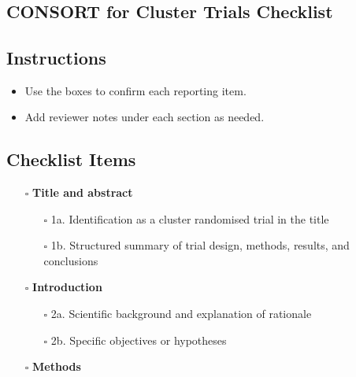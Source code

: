\documentclass[11pt]{article}
\def\tightlist{}
\begin{document}
\begin{center}
{\LARGE }\\[4pt]
\normalsize 
\end{center}
\vspace{1em}

\begin{Form}

\section{CONSORT for Cluster Trials
Checklist}\label{consort-for-cluster-trials-checklist}

\subsection{Instructions}\label{instructions}

\begin{itemize}
\tightlist
\item
  Use the boxes to confirm each reporting item.
\item
  Add reviewer notes under each section as needed.
\end{itemize}

\subsection{Checklist Items}\label{checklist-items}

\begin{itemize}
\tightlist
\item[$\square$]
  \textbf{Title and abstract}

  \begin{itemize}
  \tightlist
  \item[$\square$]
    1a. Identification as a cluster randomised trial in the title
  \item[$\square$]
    1b. Structured summary of trial design, methods, results, and
    conclusions
  \end{itemize}
\item[$\square$]
  \textbf{Introduction}

  \begin{itemize}
  \tightlist
  \item[$\square$]
    2a. Scientific background and explanation of rationale
  \item[$\square$]
    2b. Specific objectives or hypotheses
  \end{itemize}
\item[$\square$]
  \textbf{Methods}


\end{itemize}
\end{Form}
\end{document}

